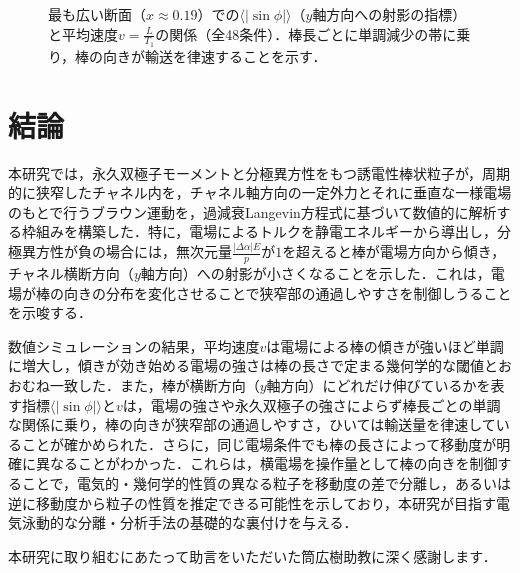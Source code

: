 \documentclass[dvipdfmx]{ampbt}
\begin{document}
  \begin{figure}[H]
    \centering
    
    \caption{最も広い断面（$x\approx0.19$）での$\langle|\sin\phi|\rangle$（$y$軸方向への射影の指標）と平均速度$v=\frac{L}{T_1}$の関係（全48条件）．棒長ごとに単調減少の帯に乗り，棒の向きが輸送を律速することを示す．}
    \label{fig:collapse}
  \end{figure}

  \section{結論}

  本研究では，永久双極子モーメントと分極異方性をもつ誘電性棒状粒子が，周期的に狭窄したチャネル内を，チャネル軸方向の一定外力とそれに垂直な一様電場のもとで行うブラウン運動を，過減衰Langevin方程式に基づいて数値的に解析する枠組みを構築した．特に，電場によるトルクを静電エネルギーから導出し，分極異方性が負の場合には，無次元量$\frac{|\Delta\alpha|E}{p}$が$1$を超えると棒が電場方向から傾き，チャネル横断方向（$y$軸方向）への射影が小さくなることを示した．これは，電場が棒の向きの分布を変化させることで狭窄部の通過しやすさを制御しうることを示唆する．

  数値シミュレーションの結果，平均速度$v$は電場による棒の傾きが強いほど単調に増大し，傾きが効き始める電場の強さは棒の長さで定まる幾何学的な閾値とおおむね一致した．また，棒が横断方向（$y$軸方向）にどれだけ伸びているかを表す指標$\langle|\sin\phi|\rangle$と$v$は，電場の強さや永久双極子の強さによらず棒長ごとの単調な関係に乗り，棒の向きが狭窄部の通過しやすさ，ひいては輸送量を律速していることが確かめられた．さらに，同じ電場条件でも棒の長さによって移動度が明確に異なることがわかった．これらは，横電場を操作量として棒の向きを制御することで，電気的・幾何学的性質の異なる粒子を移動度の差で分離し，あるいは逆に移動度から粒子の性質を推定できる可能性を示しており，本研究が目指す電気泳動的な分離・分析手法の基礎的な裏付けを与える．

  \acknowledgment
  本研究に取り組むにあたって助言をいただいた筒広樹助教に深く感謝します．
\end{document}
